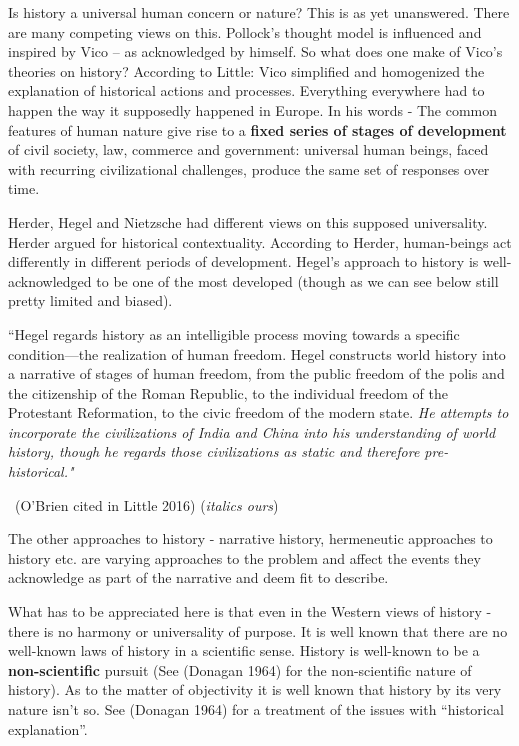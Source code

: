 Is history a universal human concern or nature? This is as yet unanswered. There are many competing views on this. Pollock’s thought model is influenced and inspired by Vico – as acknowledged by himself. So what does one make of Vico’s theories on history? According to Little: Vico simplified and homogenized the explanation of historical actions and processes. Everything everywhere had to happen the way it supposedly happened in Europe. In his words - The common features of human nature give rise to a \textbf{fixed series of stages of development} of civil society, law, commerce and government: universal human beings, faced with recurring civilizational challenges, produce the same set of responses over time.

Herder, Hegel and Nietzsche had different views on this supposed universality. Herder argued for historical contextuality. According to Herder, human-beings act differently in different periods of development. Hegel's approach to history is well-acknowledged to be one of the most developed (though as we can see below still pretty limited and biased).

\begin{myquote}
“Hegel regards history as an intelligible process moving towards a specific condition—the realization of human freedom. Hegel constructs world history into a narrative of stages of human freedom, from the public freedom of the polis and the citizenship of the Roman Republic, to the individual freedom of the Protestant Reformation, to the civic freedom of the modern state. \textit{He attempts to incorporate the civilizations of India and China into his understanding of world history, though he regards those civilizations as static and therefore pre-historical."} 

~\hfill (O'Brien cited in Little 2016) (\textit{italics ours})
\end{myquote}

The other approaches to history - narrative history, hermeneutic approaches to history etc. are varying approaches to the problem and affect the events they acknowledge as part of the narrative and deem fit to describe.

What has to be appreciated here is that even in the Western views of history - there is no harmony or universality of purpose. It is well known that there are no well-known laws of history in a scientific sense. History is well-known to be a \textbf{non-scientific} pursuit (See (Donagan 1964) for the non-scientific nature of history). As to the matter of objectivity it is well known that history by its very nature isn’t so. See (Donagan 1964) for a treatment of the issues with “historical explanation”.


